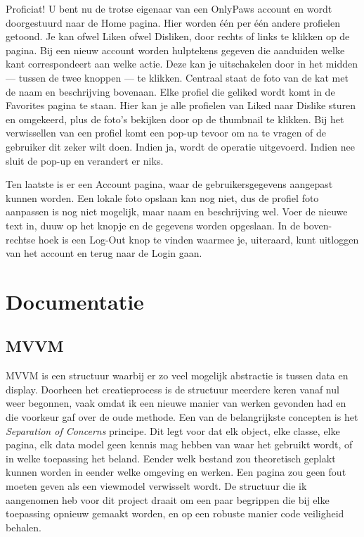 \documentclass{report}
\begin{document}
Proficiat! U bent nu de trotse eigenaar van een OnlyPaws account en wordt doorgestuurd naar de Home pagina.
Hier worden één per één andere profielen getoond. Je kan ofwel Liken ofwel Disliken, door rechts of links te klikken op de pagina. 
Bij een nieuw account worden hulptekens gegeven die aanduiden welke kant correspondeert aan welke actie. Deze kan je uitschakelen door in het midden --- tussen de twee knoppen --- te klikken.
Centraal staat de foto van de kat met de naam en beschrijving bovenaan.
Elke profiel die geliked wordt komt in de Favorites pagina te staan. Hier kan je alle profielen van Liked naar Dislike sturen en omgekeerd, plus de foto's bekijken door op de thumbnail te klikken.
Bij het verwissellen van een profiel komt een pop-up tevoor om na te vragen of de gebruiker dit zeker wilt doen. Indien ja, wordt de operatie uitgevoerd. Indien nee sluit de pop-up en verandert er niks.

Ten laatste is er een Account pagina, waar de gebruikersgegevens aangepast kunnen worden. Een lokale foto opslaan kan nog niet, dus de profiel foto aanpassen is nog niet mogelijk, maar naam en beschrijving wel.
Voer de nieuwe text in, duuw op het knopje en de gegevens worden opgeslaan.
In de boven-rechtse hoek is een Log-Out knop te vinden waarmee je, uiteraard, kunt uitloggen van het account en terug naar de Login gaan.


\chapter{Documentatie}
\section{MVVM}
MVVM is een structuur waarbij er zo veel mogelijk abstractie is tussen data en display. 
Doorheen het creatieprocess is de structuur meerdere keren vanaf nul weer begonnen, vaak omdat ik een nieuwe manier van werken gevonden had en die voorkeur gaf over de oude methode.
Een van de belangrijkste concepten is het \textit{Separation of Concerns} principe. Dit legt voor dat elk object, elke classe, elke pagina, elk data model geen kennis mag hebben van waar het gebruikt wordt, of in welke toepassing het beland.
Eender welk bestand zou theoretisch geplakt kunnen worden in eender welke omgeving en werken. Een pagina zou geen fout moeten geven als een viewmodel verwisselt wordt.
De structuur die ik aangenomen heb voor dit project draait om een paar begrippen die bij elke toepassing opnieuw gemaakt worden, en op een robuste manier code veiligheid behalen.
\end{document}
